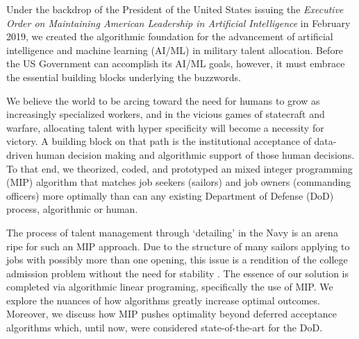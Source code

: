 Under the backdrop of the President of the United States issuing the \textit{Executive Order on Maintaining American Leadership in Artificial Intelligence} in February 2019, we created the algorithmic foundation for the advancement of artificial intelligence and machine learning (AI/ML) in military talent allocation.  Before the US Government can accomplish its AI/ML goals, however, it must embrace the essential building blocks underlying the buzzwords. 

We believe the world to be arcing toward the need for humans to grow as increasingly specialized workers, and in the vicious games of statecraft and warfare, allocating talent with hyper specificity will become a necessity for victory. A building block on that path is the institutional acceptance of data-driven human decision making and algorithmic support of those human decisions. To that end, we theorized, coded, and prototyped an mixed integer programming (MIP) algorithm that matches job seekers (sailors) and job owners (commanding officers) more optimally than can any existing Department of Defense (DoD) process, algorithmic or human. 

The process of talent management through ‘detailing’ in the Navy is an arena ripe for such an MIP approach. Due to the structure of many sailors applying to jobs  with possibly more than one opening, this issue is a rendition of the college admission problem \cite{1962_Gale} without the need for stability \cite{1988_Roth_Sotomayor}. The essence of our solution is completed via algorithmic linear programing, specifically the use of MIP. We explore the nuances of how algorithms greatly increase optimal outcomes. Moreover, we discuss how MIP pushes optimality beyond deferred acceptance algorithms which, until now, were considered state-of-the-art for the DoD. 
